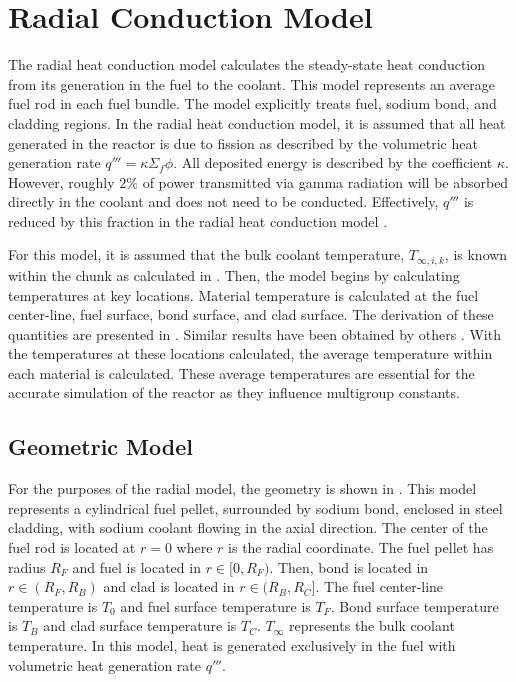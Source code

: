 \section{Radial Conduction Model}
  \label{sec:radial_conduction_model}
  The radial heat conduction model calculates the steady-state heat
  conduction from its generation in the fuel to the coolant. This model
  represents an average fuel rod in each fuel bundle. The model explicitly
  treats fuel, sodium bond, and cladding regions.
  In the radial heat conduction model, it is assumed that all heat generated in
  the reactor is due to fission as described by the volumetric heat
  generation rate ${q'''=\kappa \Sigma_f \phi}$. All deposited energy is
  described by the coefficient $\kappa$. However, roughly $2\%$ of power
  transmitted via gamma radiation will be absorbed directly in the coolant and
  does not need to be conducted. Effectively, $q'''$ is reduced by this fraction
  in the radial heat conduction model \cite{FastSpectrumReactors}.
  
  For this model, it is assumed
  that the bulk coolant temperature, $T_{\infty,i,k}$, is known within the chunk 
  as calculated in . Then, the model begins by 
  calculating temperatures at key locations. Material temperature is calculated
  at the fuel center-line, fuel surface, bond surface, and clad surface. The
  derivation of these quantities are presented in . 
  Similar results have been obtained by others \cite{FastSpectrumReactors}. 
  With the temperatures at these locations calculated, the average temperature 
  within each material is calculated. These average temperatures are essential 
  for the accurate simulation of the reactor as they influence multigroup 
  constants.

  \subsection{Geometric Model}
    For the purposes of the radial model, the geometry is shown in
    . This model represents a cylindrical fuel pellet,
    surrounded by sodium bond, enclosed in steel cladding, with sodium coolant
    flowing in the axial direction. The center of the fuel rod is located at
    $r=0$ where $r$ is the radial coordinate. The fuel pellet has radius $R_F$
    and fuel is located in $r \in [0,R_F)$. Then, bond is located in 
    $r \in (R_F,R_B)$ and clad is located in $r \in (R_B,R_C]$. The fuel 
    center-line temperature is $T_0$ and fuel surface temperature is $T_F$. Bond
    surface temperature is $T_B$ and clad surface temperature is 
    $T_C$. $T_{\infty}$ represents the bulk coolant temperature. In this model,
    heat is generated exclusively in the fuel with volumetric heat generation 
    rate $q'''$. 

